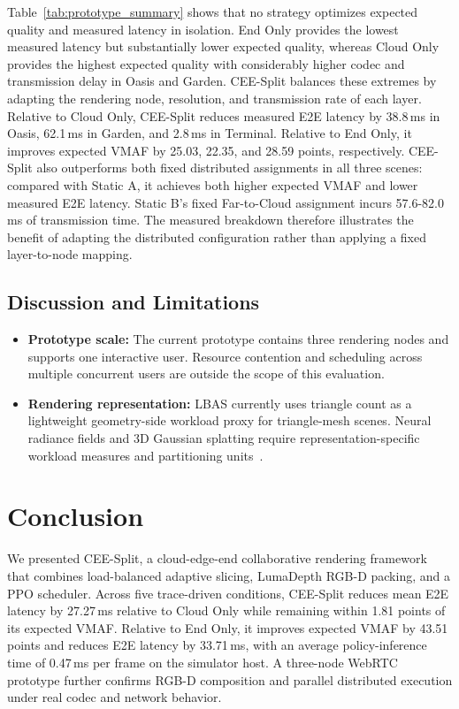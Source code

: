 \documentclass[10pt,journal,compsoc]{IEEEtran}
\begin{document}
Table~\ref{tab:prototype_summary} shows that no strategy optimizes expected quality and measured latency in isolation. End Only provides the lowest measured latency but substantially lower expected quality, whereas Cloud Only provides the highest expected quality with considerably higher codec and transmission delay in Oasis and Garden. CEE-Split balances these extremes by adapting the rendering node, resolution, and transmission rate of each layer. Relative to Cloud Only, CEE-Split reduces measured E2E latency by 38.8\,ms in Oasis, 62.1\,ms in Garden, and 2.8\,ms in Terminal. Relative to End Only, it improves expected VMAF by 25.03, 22.35, and 28.59 points, respectively. CEE-Split also outperforms both fixed distributed assignments in all three scenes: compared with Static A, it achieves both higher expected VMAF and lower measured E2E latency. Static B's fixed Far-to-Cloud assignment incurs 57.6-82.0\,ms of transmission time. The measured breakdown therefore illustrates the benefit of adapting the distributed configuration rather than applying a fixed layer-to-node mapping.

\subsection{Discussion and Limitations}

\begin{itemize}
	\item \textbf{Prototype scale:} The current prototype contains three rendering nodes and supports one interactive user. Resource contention and scheduling across multiple concurrent users are outside the scope of this evaluation.
	
	\item \textbf{Rendering representation:} LBAS currently uses triangle count as a lightweight geometry-side workload proxy for triangle-mesh scenes. Neural radiance fields and 3D Gaussian splatting require representation-specific workload measures and partitioning units~\cite{wu_embracing_2024,zhu_nebula_2025}.

\end{itemize}

\section{Conclusion}
\label{sec:conclusion}

We presented CEE-Split, a cloud-edge-end collaborative rendering framework that combines load-balanced adaptive slicing, LumaDepth RGB-D packing, and a PPO scheduler. Across five trace-driven conditions, CEE-Split reduces mean E2E latency by 27.27\,ms relative to Cloud Only while remaining within 1.81 points of its expected VMAF. Relative to End Only, it improves expected VMAF by 43.51 points and reduces E2E latency by 33.71\,ms, with an average policy-inference time of 0.47\,ms per frame on the simulator host. A three-node WebRTC prototype further confirms RGB-D composition and parallel distributed execution under real codec and network behavior.



\end{document}
